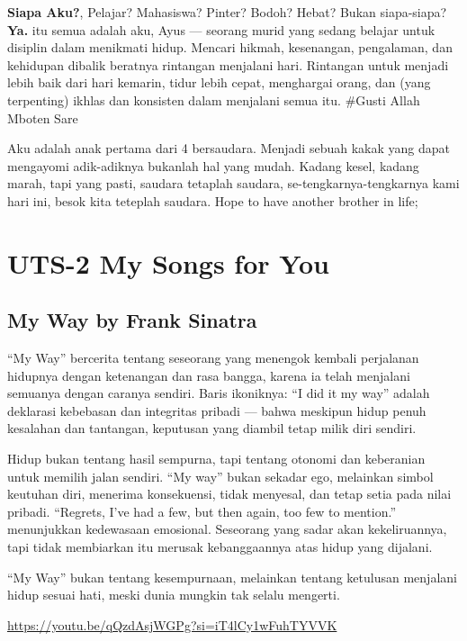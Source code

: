 \documentclass[
  letterpaper,
  DIV=11,
  numbers=noendperiod]{scrreprt}
\begin{document}
\textbf{Siapa Aku?}, Pelajar? Mahasiswa? Pinter? Bodoh? Hebat? Bukan
siapa-siapa?\\
\textbf{Ya.} itu semua adalah aku, Ayus --- seorang murid yang sedang
belajar untuk disiplin dalam menikmati hidup. Mencari hikmah,
kesenangan, pengalaman, dan kehidupan dibalik beratnya rintangan
menjalani hari. Rintangan untuk menjadi lebih baik dari hari kemarin,
tidur lebih cepat, menghargai orang, dan (yang terpenting) ikhlas dan
konsisten dalam menjalani semua itu. \#Gusti Allah Mboten Sare

Aku adalah anak pertama dari 4 bersaudara. Menjadi sebuah kakak yang
dapat mengayomi adik-adiknya bukanlah hal yang mudah. Kadang kesel,
kadang marah, tapi yang pasti, saudara tetaplah saudara,
se-tengkarnya-tengkarnya kami hari ini, besok kita teteplah saudara.
Hope to have another brother in life;


\chapter{UTS-2 My Songs for You}\label{uts-2-my-songs-for-you}

\section{My Way by Frank Sinatra}\label{my-way-by-frank-sinatra}

``My Way'' bercerita tentang seseorang yang menengok kembali perjalanan
hidupnya dengan ketenangan dan rasa bangga, karena ia telah menjalani
semuanya dengan caranya sendiri. Baris ikoniknya: ``I did it my way''
adalah deklarasi kebebasan dan integritas pribadi --- bahwa meskipun
hidup penuh kesalahan dan tantangan, keputusan yang diambil tetap milik
diri sendiri.

Hidup bukan tentang hasil sempurna, tapi tentang otonomi dan keberanian
untuk memilih jalan sendiri. ``My way'' bukan sekadar ego, melainkan
simbol keutuhan diri, menerima konsekuensi, tidak menyesal, dan tetap
setia pada nilai pribadi. ``Regrets, I've had a few, but then again, too
few to mention.'' menunjukkan kedewasaan emosional. Seseorang yang sadar
akan kekeliruannya, tapi tidak membiarkan itu merusak kebanggaannya atas
hidup yang dijalani.

``My Way'' bukan tentang kesempurnaan, melainkan tentang ketulusan
menjalani hidup sesuai hati, meski dunia mungkin tak selalu mengerti.

\url{https://youtu.be/qQzdAsjWGPg?si=iT4lCy1wFuhTYVVK}
\end{document}
